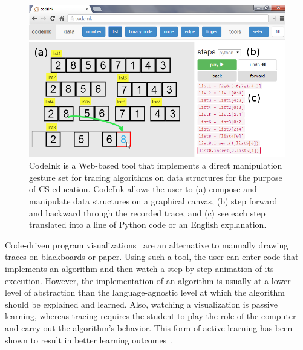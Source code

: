 \begin{figure}

\begin{center}
\includegraphics[width=\columnwidth]{img/frontpage-mergesort.png}
\end{center}

\caption{CodeInk is a Web-based tool that implements a direct
manipulation gesture set for tracing algorithms on data structures for the
purpose of CS education. CodeInk allows the user to (a) compose and
manipulate data structures on a graphical canvas, (b) step forward and
backward through the recorded trace, and (c) see each step translated
into a line of Python code or an English explanation.}


\label{fig:codeink-intro}
\end{figure}

Code-driven program visualizations~\cite{Guo2013, Sorva2013} are an alternative
to manually drawing traces on blackboards or paper. Using such a tool, the user
can enter code that implements an algorithm and then watch a step-by-step
animation of its execution.
However, the implementation of an algorithm is usually at a lower level of
abstraction than the language-agnostic level at which the algorithm should be
explained and learned. Also, watching a visualization is passive learning,
whereas tracing requires the student to play the role of the computer and carry
out the algorithm's behavior.
This form of active learning has been shown to result in better learning
outcomes~\cite{Sorva2012Diss}.

